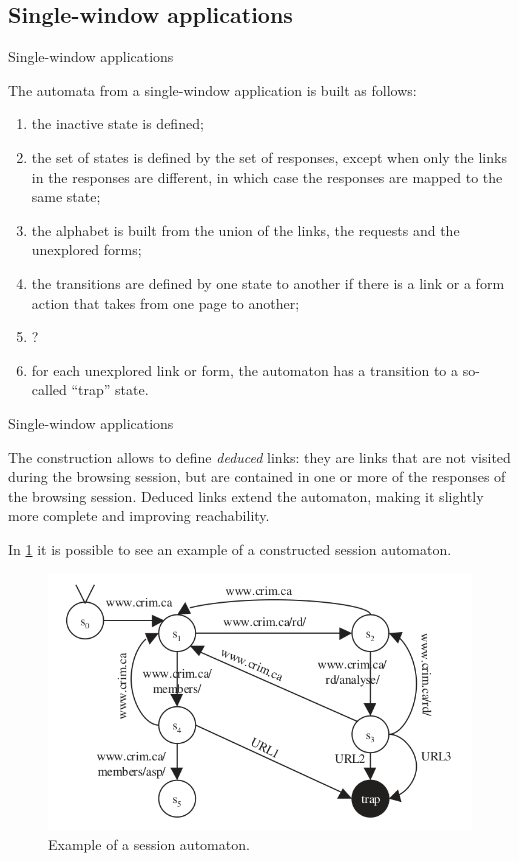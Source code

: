 \documentclass[usenames,dvipsnames]{beamer}
\begin{document}
\subsection{Single-window applications}
\begin{frame}{Single-window applications}
\label{single-window-applications}

The automata from a single-window application is built as follows:

\begin{enumerate}
  \item the inactive state is defined;
  \item the set of states is defined by the set of responses, except when only the links in the responses are different, in which case the responses are mapped to the same state;
  \item the alphabet is built from the union of the links, the requests and the unexplored forms;
  \item the transitions are defined by one state to another if there is a link or a form action that takes from one page to another;
  \item ?
  \item for each unexplored link or form, the automaton has a transition to a so-called ``trap'' state.
\end{enumerate}

\end{frame}

\begin{frame}{Single-window applications}

The construction allows to define \emph{deduced} links: they are links that are not visited during the browsing session, but are contained in one or more of the responses of the browsing session. Deduced links extend the automaton, making it slightly more complete and improving reachability.

In \cref{fig:example-session-automaton} it is possible to see an example of a constructed session automaton.

\begin{figure}[h]
  \includegraphics[width=\textwidth]{../img/session_automaton_example.png}
  \caption{Example of a session automaton.}
  \label{fig:example-session-automaton}
\end{figure}

\end{frame}
\end{document}
